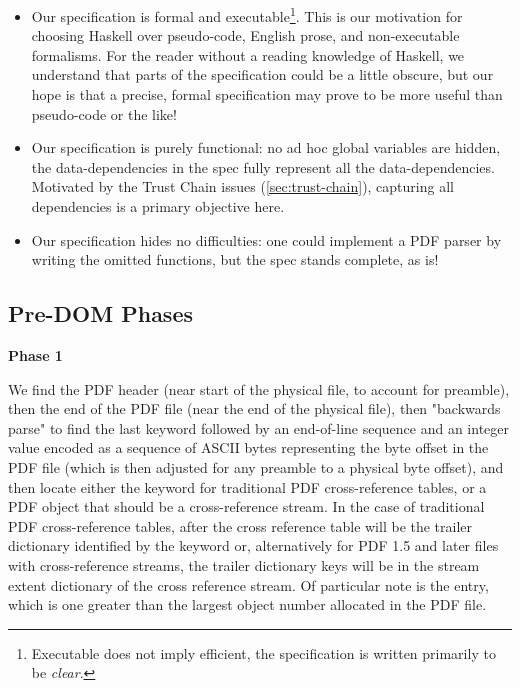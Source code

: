 \begin{itemize}
\item Our specification is formal and executable\footnote{
  Executable does not imply efficient, the specification is written
  primarily to be \emph{clear}.}.
  This is our motivation for choosing Haskell over pseudo-code, English prose,
  and non-executable formalisms.  For the reader without a reading knowledge of
  Haskell, we understand that parts of the specification could be a little
  obscure, but our hope is that a precise, formal specification may prove to be
  more useful than pseudo-code or the like!
  
\item Our specification is purely functional: no ad hoc global variables are
  hidden, the data-dependencies in the spec fully represent all the
  data-dependencies.  Motivated by the Trust Chain issues
  (\cref{sec:trust-chain}), capturing all dependencies is a primary objective
  here.
  
\item Our specification hides no difficulties: one could implement a PDF parser
  by writing the omitted functions, but the spec stands complete, as is!
\end{itemize}


\subsection{Pre-DOM Phases }

{\bf{Phase 1}}

We find the PDF header  (near start of the physical file, to
account for preamble), then the end of the PDF file  (near the
end of the physical file), then "backwards parse" to find the last
 keyword followed by an end-of-line sequence and an integer
value encoded as a sequence of ASCII bytes representing the byte offset in the
PDF file (which is then adjusted for any preamble to a physical byte offset),
and then locate either the  keyword for traditional PDF
cross-reference tables, or a PDF object that should be a cross-reference
stream. In the case of traditional PDF cross-reference tables, after the cross
reference table will be the trailer dictionary identified by the 
keyword or, alternatively for PDF 1.5 and later files with cross-reference
streams, the trailer dictionary keys will be in the stream extent dictionary of
the cross reference stream. Of particular note is the  entry, which
is one greater than the largest object number allocated in the PDF file.

